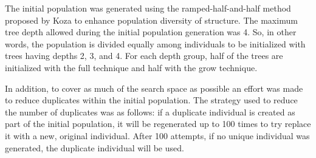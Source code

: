 The initial population was generated using the ramped-half-and-half method proposed by Koza \cite{koza1992genetic} to enhance population diversity of structure. The maximum tree depth allowed during the initial population generation was 4. So, in other words, the population is divided equally among individuals to be initialized with trees having depths 2, 3, and 4. For each depth group, half of the trees are initialized with the full technique and half with the grow technique.

In addition, to cover as much of the search space as possible an effort was made to reduce duplicates within the initial population. The strategy used to reduce the number of duplicates was as follows: if a duplicate individual is created as part of the initial population, it will be regenerated up to 100 times to try replace it with a new, original individual. After 100 attempts, if no unique individual was generated, the duplicate individual will be used.